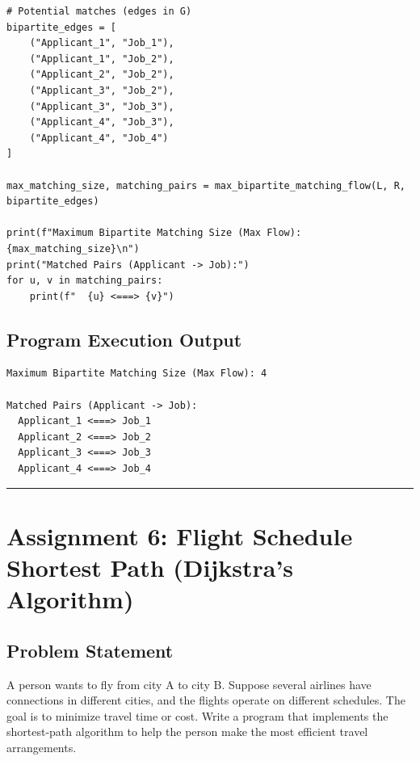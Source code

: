 \documentclass[12pt]{article}
\begin{document}
\begin{lstlisting}[style=code]
# Potential matches (edges in G)
bipartite_edges = [
    ("Applicant_1", "Job_1"),
    ("Applicant_1", "Job_2"),
    ("Applicant_2", "Job_2"),
    ("Applicant_3", "Job_2"),
    ("Applicant_3", "Job_3"),
    ("Applicant_4", "Job_3"),
    ("Applicant_4", "Job_4")
]

max_matching_size, matching_pairs = max_bipartite_matching_flow(L, R, bipartite_edges)

print(f"Maximum Bipartite Matching Size (Max Flow): {max_matching_size}\n")
print("Matched Pairs (Applicant -> Job):")
for u, v in matching_pairs:
    print(f"  {u} <===> {v}")
\end{lstlisting}

\subsection*{Program Execution Output}
\begin{lstlisting}[style=output]
Maximum Bipartite Matching Size (Max Flow): 4

Matched Pairs (Applicant -> Job):
  Applicant_1 <===> Job_1
  Applicant_2 <===> Job_2
  Applicant_3 <===> Job_3
  Applicant_4 <===> Job_4
\end{lstlisting}

\vspace{0.5cm}
\hrule
\vspace{0.5cm}

\section*{Assignment 6: Flight Schedule Shortest Path (Dijkstra's Algorithm)}

\subsection*{Problem Statement}
A person wants to fly from city A to city B. Suppose several airlines have connections in different cities, and the flights operate on different schedules. The goal is to minimize travel time or cost. Write a program that implements the shortest-path algorithm to help the person make the most efficient travel arrangements.
\end{document}
